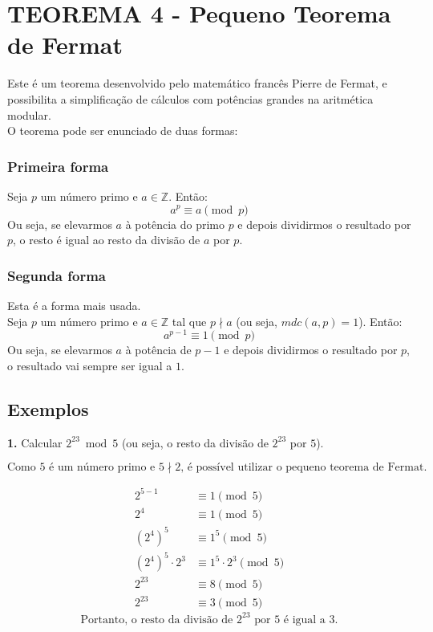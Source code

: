 \section*{TEOREMA 4 - Pequeno Teorema de Fermat}
Este é um teorema desenvolvido pelo matemático francês Pierre de Fermat, e possibilita a simplificação de cálculos com potências grandes na aritmética modular.\\
O teorema pode ser enunciado de duas formas:

\subsubsection*{Primeira forma}
Seja $p$ um número primo e $a \in \mathbb{Z}$. Então:
\[
    a^p \equiv a \pmod{p}
\]
Ou seja, se elevarmos $a$ à potência do primo $p$ e depois dividirmos o resultado por $p$, o resto é igual ao resto da divisão de $a$ por $p$.

\subsubsection*{Segunda forma}
Esta é a forma mais usada.\\
Seja $p$ um número primo e $a \in \mathbb{Z}$ tal que $p \nmid a$ (ou seja, $mdc(a,p) = 1$). Então:
\[
    a^{p-1} \equiv 1 \pmod {p}
\]
Ou seja, se elevarmos $a$ à potência de $p-1$ e depois dividirmos o resultado por $p$, o resultado vai sempre ser igual a $1$.

\subsection*{Exemplos}
\textbf{1.} Calcular $2^{23} \bmod 5$ (ou seja, o resto da divisão de $2^{23}$ por $5$).

\[
    \text{Como 5 é um número primo e $5 \nmid 2$, é possível utilizar o pequeno teorema de Fermat.}
\]

\setcounter{equation}{0}
\begin{align}
    2^{5-1}                 & \equiv 1 \pmod{5}                 \\
    2^{4}                   & \equiv 1 \pmod {5}                \\
    (2^{4})^{5}             & \equiv 1^{5} \pmod {5}            \\
    (2^{4})^{5} \cdot 2^{3} & \equiv 1^{5} \cdot 2^{3} \pmod{5} \\
    2^{23}                  & \equiv 8 \pmod{5}                 \\
    2^{23}                  & \equiv 3 \pmod {5}
\end{align}
\[
    \text{Portanto, o resto da divisão de $2^{23}$ por 5 é igual a 3.}
\]